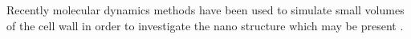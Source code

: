 Recently molecular dynamics methods have been used to simulate small volumes of
the cell wall in order to investigate the nano structure which may be present \cite{Charlier_2012}\cite{Zhang_2009}\cite{Sangha_2011}\cite{houtman1995cellulose}.